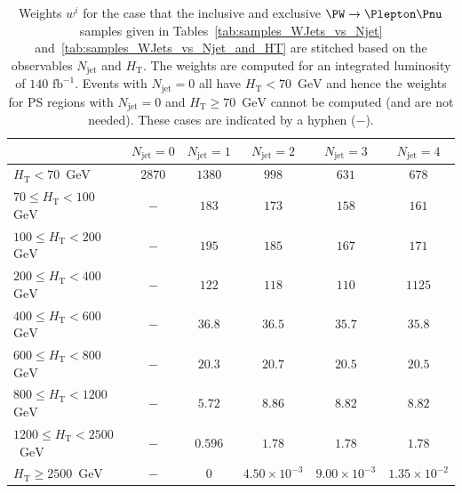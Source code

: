 \documentclass[twocolumn,epjc3]{svjour3}
\newcommand{\HT}{\ensuremath{H_{\mathrm{T}}}\xspace}
\newcommand{\GeV}{\ensuremath{\textrm{GeV}}\xspace}
\newcommand{\jet}{\ensuremath{\textrm{jet}}\xspace}
\newcommand{\fbinv}{\ensuremath{\textrm{~fb}^{-1}}\xspace}
\begin{document}
\begin{table}
\caption{
  Weights $w^{i}$ for the case that the inclusive and exclusive $\PW \to \Plepton\Pnu$ samples 
  given in 
  Tables~\ref{tab:samples_WJets_vs_Njet} and~\ref{tab:samples_WJets_vs_Njet_and_HT}
  are stitched based on the observables $N_{\jet}$ and $\HT$.
  The weights are computed for an integrated luminosity of $140\fbinv$.
  Events with $N_{\jet} = 0$ all have $\HT < 70$~\GeV and hence the weights for PS regions with $N_{\jet} = 0$ and $\HT \geqslant 70$~\GeV cannot be computed (and are not needed).
  These cases are indicated by a hyphen ($-$).
}
\label{tab:weights_WJets_vs_Njet_and_HT}
\centering
\def\arraystretch{1.3}
\begin{tabular}{l|c|c|c|c|c}
\hline
                                 & $N_{\jet} = 0$ & $N_{\jet} = 1$      & $N_{\jet} = 2$      & $N_{\jet} = 3$      & $N_{\jet} = 4$       \\ 
\hline
\hline
               $\HT < 70$~\GeV   & $2870$         & $1380$              & $998$               & $631$               &  $678$               \\
  $70 \leqslant \HT < 100$~\GeV  & $-$            &  $183$              & $173$               & $158$               &  $161$               \\
 $100 \leqslant \HT < 200$~\GeV  & $-$            &  $195$              & $185$               & $167$               &  $171$               \\
 $200 \leqslant \HT < 400$~\GeV  & $-$            &  $122$              & $118$               & $110$               &  $1125$              \\
 $400 \leqslant \HT < 600$~\GeV  & $-$            & $36.8$              & $36.5$              & $35.7$              &  $35.8$              \\
 $600 \leqslant \HT < 800$~\GeV  & $-$            & $20.3$              & $20.7$              & $20.5$              &  $20.5$              \\
 $800 \leqslant \HT < 1200$~\GeV & $-$            & $5.72$              & $8.86$              & $8.82$              &  $8.82$              \\
$1200 \leqslant \HT < 2500$~\GeV & $-$            & $0.596$             & $1.78$              & $1.78$              &  $1.78$              \\
       $\HT \geqslant 2500$~\GeV & $-$            & $0$                 & $4.50\times10^{-3}$ & $9.00\times10^{-3}$ &  $1.35\times10^{-2}$ \\ 
\hline
\end{tabular}
\end{table}
\end{document}
